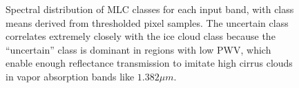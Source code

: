 \documentclass[12pt]{article}
\begin{document}
\begin{figure}[h!]
    \centering

    \begin{center}
    \end{center}

    \caption{Spectral distribution of MLC classes for each input band, with class means derived from thresholded pixel samples. The uncertain class correlates extremely closely with the ice cloud class because the ``uncertain'' class is dominant in regions with low PWV, which enable enough reflectance transmission to imitate high cirrus clouds in vapor absorption bands like $1.382\mu m$.}
    \label{mlc_thresh_spectra}
\end{figure}


\clearpage
\end{document}
